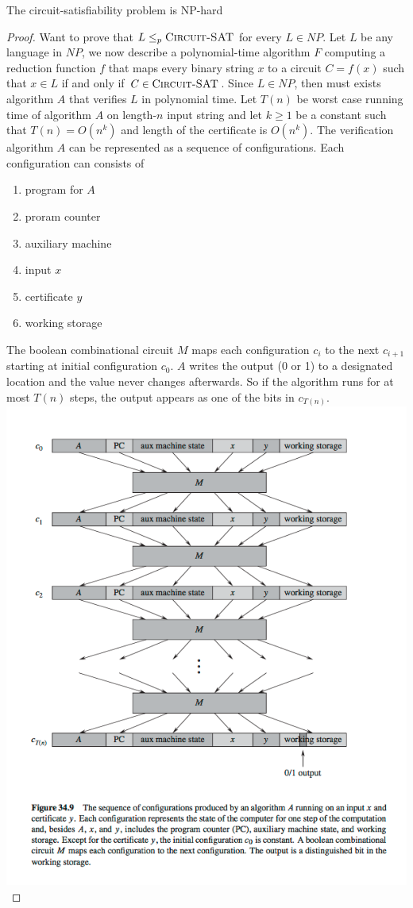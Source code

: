 \documentclass[11pt]{article}
\begin{document}
\begin{lemma*}
    The circuit-satisfiability problem is NP-hard 
    \begin{proof}
        Want to prove that $L \leq_p \textsc{Circuit-SAT}$ for every $L\in NP$. Let $L$ be any language in $NP$, we now describe a polynomial-time algorithm $F$ computing a reduction function $f$ that maps every binary string $x$ to a circuit $C = f(x)$ such that $x\in L$ if and only if $C \in \textsc{Circuit-SAT}$. Since $L\in NP$, then must exists algorithm $A$ that verifies $L$ in polynomial time. Let $T(n)$ be worst case running time of algorithm $A$ on length-$n$ input string and let $k\geq 1$ be a constant such that $T(n) = O(n^k)$ and length of the certificate is $O(n^k)$. The verification algorithm $A$ can be represented as a sequence of configurations. Each configuration can consists of 
        \begin{enumerate}
            \item program for $A$
            \item proram counter
            \item auxiliary machine 
            \item input $x$
            \item certificate $y$
            \item working storage 
        \end{enumerate}
        The boolean combinational circuit $M$ maps each configuration $c_i$ to the next $c_{i+1}$ starting at initial configuration $c_0$. $A$ writes the output (0 or 1) to a designated location and the value never changes afterwards. So if the algorithm runs for at most $T(n)$ steps, the output appears as one of the bits in $c_{T(n)}$. \\
        \includegraphics[width=\textwidth]{circuit_sat_nphard.png}

\end{proof}
\end{lemma*}
\end{document}
